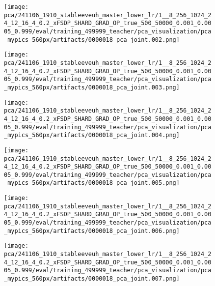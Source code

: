 \begin{figure*}[p]
\begin{subfigure}[t]{0.097\textwidth}
    \end{subfigure}\hfill
    \begin{subfigure}[t]{0.097\textwidth}
        \centering
        \texttt{[image: pca/241106\_1910\_stableeveuh\_master\_lower\_lr/1\_\_8\_256\_1024\_24\_12\_16\_4\_0.2\_xFSDP\_SHARD\_GRAD\_OP\_true\_500\_50000\_0.001\_0.0005\_0.999/eval/training\_499999\_teacher/pca\_visualization/pca\_mypics\_560px/artifacts/0000018\_pca\_joint.002.png]}
    \end{subfigure}\hfill
    \begin{subfigure}[t]{0.097\textwidth}
        \centering
        \texttt{[image: pca/241106\_1910\_stableeveuh\_master\_lower\_lr/1\_\_8\_256\_1024\_24\_12\_16\_4\_0.2\_xFSDP\_SHARD\_GRAD\_OP\_true\_500\_50000\_0.001\_0.0005\_0.999/eval/training\_499999\_teacher/pca\_visualization/pca\_mypics\_560px/artifacts/0000018\_pca\_joint.003.png]}
    \end{subfigure}\hfill
    \begin{subfigure}[t]{0.097\textwidth}
        \centering
        \texttt{[image: pca/241106\_1910\_stableeveuh\_master\_lower\_lr/1\_\_8\_256\_1024\_24\_12\_16\_4\_0.2\_xFSDP\_SHARD\_GRAD\_OP\_true\_500\_50000\_0.001\_0.0005\_0.999/eval/training\_499999\_teacher/pca\_visualization/pca\_mypics\_560px/artifacts/0000018\_pca\_joint.004.png]}
    \end{subfigure}\hfill
    \begin{subfigure}[t]{0.097\textwidth}
        \centering
        \texttt{[image: pca/241106\_1910\_stableeveuh\_master\_lower\_lr/1\_\_8\_256\_1024\_24\_12\_16\_4\_0.2\_xFSDP\_SHARD\_GRAD\_OP\_true\_500\_50000\_0.001\_0.0005\_0.999/eval/training\_499999\_teacher/pca\_visualization/pca\_mypics\_560px/artifacts/0000018\_pca\_joint.005.png]}
    \end{subfigure}\hfill
    \begin{subfigure}[t]{0.097\textwidth}
        \centering
        \texttt{[image: pca/241106\_1910\_stableeveuh\_master\_lower\_lr/1\_\_8\_256\_1024\_24\_12\_16\_4\_0.2\_xFSDP\_SHARD\_GRAD\_OP\_true\_500\_50000\_0.001\_0.0005\_0.999/eval/training\_499999\_teacher/pca\_visualization/pca\_mypics\_560px/artifacts/0000018\_pca\_joint.006.png]}
    \end{subfigure}\hfill
    \begin{subfigure}[t]{0.097\textwidth}
        \centering
        \texttt{[image: pca/241106\_1910\_stableeveuh\_master\_lower\_lr/1\_\_8\_256\_1024\_24\_12\_16\_4\_0.2\_xFSDP\_SHARD\_GRAD\_OP\_true\_500\_50000\_0.001\_0.0005\_0.999/eval/training\_499999\_teacher/pca\_visualization/pca\_mypics\_560px/artifacts/0000018\_pca\_joint.007.png]}

\end{subfigure}
\end{figure*}
